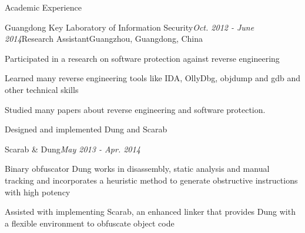 \documentclass{resume} %
\begin{document}
\begin{rSection}{Academic Experience}

\begin{rSubsection}{Guangdong Key Laboratory of Information Security}{\em Oct. 2012 - June 2014}{Research Assistant}{Guangzhou, Guangdong, China}
\item Participated in a research on software protection against reverse engineering
\item Learned many reverse engineering tools like IDA, OllyDbg, objdump and gdb and other technical skills
\item Studied many papers about reverse engineering and software protection.
\item Designed and implemented Dung and Scarab
\end{rSubsection}


\begin{rSubsection}{Scarab \& Dung}{\em May 2013 - Apr. 2014}{}{}
\item Binary obfuscator Dung works in disassembly, static analysis and manual tracking and incorporates a heuristic method to generate obstructive instructions with high potency
\item Assisted with implementing Scarab, an enhanced linker that provides Dung with a flexible environment to obfuscate object code
\end{rSubsection}

\end{rSection}



\end{document}

